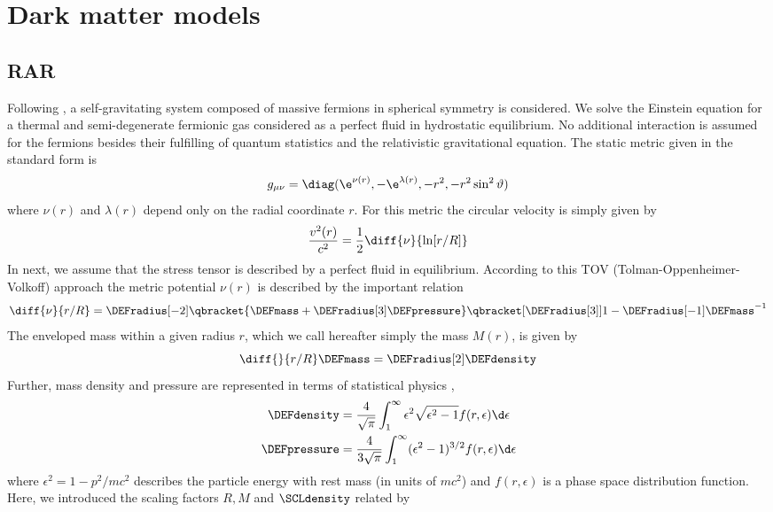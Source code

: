 \section{Dark matter models}
\subsection{RAR}
Following \citet{1992A&A...258..223I,2015MNRAS.451..622R}, a self-gravitating system composed of massive fermions in spherical symmetry is considered. We solve the Einstein equation for a thermal and semi-degenerate fermionic gas considered as a perfect fluid in hydrostatic equilibrium. No additional interaction is assumed for the fermions besides their fulfilling of quantum statistics and the relativistic gravitational equation. The static metric given in the standard form is \begin{equation}
	\label{eqn:rel:metric}
	g_{\mu\nu}=\diag(\e^{\nu(r)},-\e^{\lambda(r)},-r^2,-r^2\sin^2\vartheta)
\end{equation} where $\nu(r)$ and $\lambda(r)$ depend only on the radial coordinate $r$. For this metric the circular velocity is simply given by \begin{equation}
	\label{eqn:rel:velocity}
	\frac{v^2(r)}{c^2} = \frac12 \diff{\nu}{\ln[r/R]}
\end{equation} In next, we assume that the stress tensor is described by a perfect fluid in equilibrium. According to this TOV (Tolman-Oppenheimer-Volkoff) approach the metric potential $\nu(r)$ is described by the important relation\begin{equation}
	\label{eqn:rel:solution-nu-A}
	\diff{\nu}{r/R} = \DEFradius[-2] \qbracket{\DEFmass + \DEFradius[3]\DEFpressure} \qbracket[{\DEFradius[3]}]{1 - \DEFradius[-1]\DEFmass}^{-1}
\end{equation} The enveloped mass within a given radius $r$, which we call hereafter simply the mass $M(r)$, is given by \begin{equation}
	\label{eqn:rel:mass}
	\diff{}{r/R} \DEFmass	= \DEFradius[2] \DEFdensity
\end{equation} Further, mass density and pressure are represented in terms of statistical physics \citep{shapiro_black_2008}, \begin{align}
	\DEFdensity		&= \frac{4}{\sqrt{\pi}} \int_1^\infty\epsilon^2 \sqrt{\epsilon^2 - 1} f(r,\epsilon) \d\epsilon\\
	\DEFpressure	&= \frac{4}{3\sqrt{\pi}} \int_1^\infty (\epsilon^2 - 1)^{3/2} f(r,\epsilon) \d\epsilon
\end{align} where $\epsilon^2 = 1 - p^2/mc^2$ describes the particle energy with rest mass (in units of $m c^2$) and $f(r,\epsilon)$ is a phase space distribution function. Here, we introduced the scaling factors $R,M$ and $\SCLdensity$ related by \begin{align}

\end{align}
